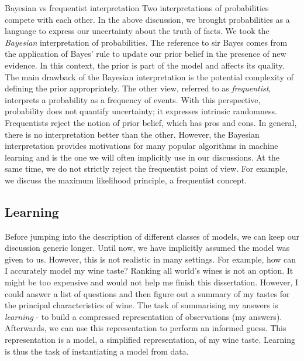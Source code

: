 \begin{side_note}{Bayesian vs frequentist interpretation}
  Two interpretations of probabilities compete with each other. In the above discussion, we brought probabilities as a language to express our uncertainty about the truth of facts. We took the \textit{Bayesian} interpretation of probabilities. The reference to sir Bayes comes from the application of Bayes' rule to update our prior belief in the presence of new evidence. In this context, the prior is part of the model and affects its quality. The main drawback of the Bayesian interpretation is the potential complexity of defining the prior appropriately. The other view, referred to as \textit{frequentist}, interprets a probability as a frequency of events. With this perspective, probability does not quantify uncertainty; it expresses intrinsic randomness. Frequentists reject the notion of prior belief, which has pros and cons. In general, there is no interpretation better than the other. However, the Bayesian interpretation provides motivations for many popular algorithms in machine learning and is the one we will often implicitly use in our discussions. At the same time, we do not strictly reject the frequentist point of view. For example, we discuss the maximum likelihood principle, a frequentist concept.
\end{side_note}
%

\subsection{Learning}
Before jumping into the description of different classes of models, we can keep our discussion generic longer.
Until now, we have implicitly assumed the model was given to us. However, this is not realistic in many settings. For example, how can I accurately model my wine taste? Ranking all world's wines is not an option. It might be too expensive and would not help me finish this dissertation. However, I could answer a list of questions and then figure out a summary of my tastes for the principal characteristics of wine. The task of summarising my answers is \textit{learning} - to build a compressed representation of observations (my answers). Afterwards, we can use this representation to perform an informed guess. This representation is a model, a simplified representation, of my wine taste. Learning is thus the task of instantiating a model from data.

